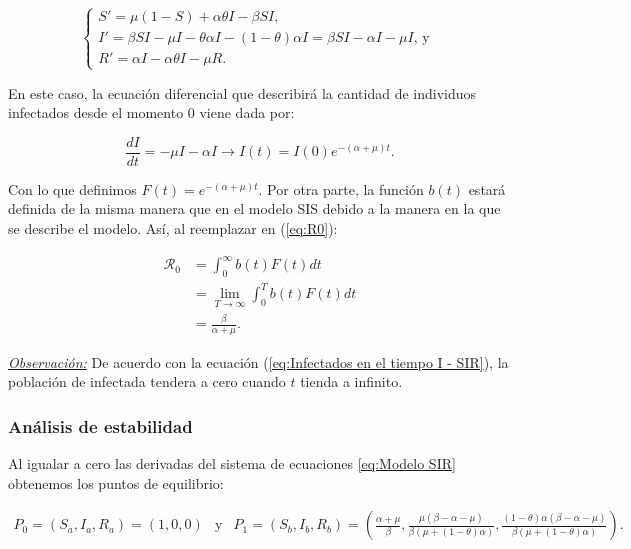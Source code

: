 \begin{equation}\label{eq:Modelo SIR}
\left\{
\begin{array}{l}
S' = \mu(1 - S) + \alpha\theta I - \beta S I, \\
I' = \beta S I - \mu I - \theta\alpha I - (1 - \theta)\alpha I = \beta S I - \alpha I - \mu I\text{, y } \\
R' = \alpha I - \alpha\theta I - \mu R.
\end{array}
\right.
\end{equation}

En este caso, la ecuación diferencial que describirá la cantidad de individuos infectados desde el momento 0 viene dada por:

\begin{equation}\label{eq:Infectados en el tiempo I - SIR}
    \frac{dI}{dt}=-\mu I - \alpha I \longrightarrow I(t)=I(0)e^{-(\alpha+\mu)t}.
\end{equation}

Con lo que definimos $F(t)=e^{-(\alpha+\mu)t}$. Por otra parte, la función $b(t)$ estará definida de la misma manera que en el modelo SIS debido a la manera en la que se describe el modelo. Así, al reemplazar en (\ref{eq:R0}):

\begin{align*}
\mathcal{R}_0 &= \int_0^\infty b(t)F(t) dt \\
&= \lim_{T\to\infty} \int_0^T b(t)F(t) dt \\
&= \frac{\beta}{\alpha+\mu}.
\end{align*}

\underline{\textit{Observación:}} De acuerdo con la ecuación (\ref{eq:Infectados en el tiempo I - SIR}), la población de infectada tendera a cero cuando $t$ tienda a infinito.

\subsubsection{Análisis de estabilidad}

Al igualar a cero las derivadas del sistema de ecuaciones \ref{eq:Modelo SIR} obtenemos los puntos de equilibrio:

$$\begin{array}{ccc}
P_0=(S_a,I_a,R_a)=(1,0,0) & \text{y} & P_1=(S_b,I_b,R_b)=\left(\frac{\alpha+\mu}{\beta},\frac{\mu(\beta-\alpha-\mu)}{\beta(\mu+(1-\theta)\alpha)},\frac{(1-\theta)\alpha(\beta-\alpha-\mu)}{\beta(\mu+(1-\theta)\alpha)}\right).
\end{array}$$

